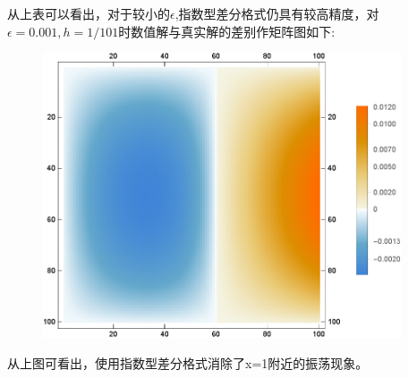 \documentclass[12pt]{article}
\theoremstyle{remark}
\begin{document}
从上表可以看出，对于较小的$\epsilon$,指数型差分格式仍具有较高精度，对$\epsilon=0.001,h=1/101$时数值解与真实解的差别作矩阵图如下:
\begin{figure}[h]
\centering
\includegraphics[width=300pt]{Exponentialpoint.eps}
\end{figure}

从上图可看出，使用指数型差分格式消除了x=1附近的振荡现象。
\end{document}
